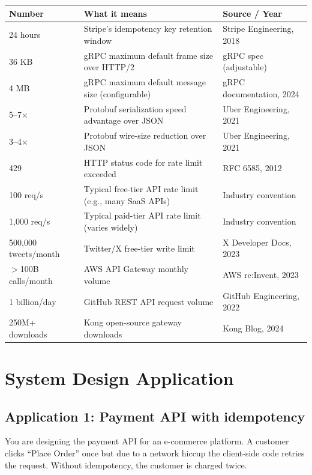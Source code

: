 \documentclass[11pt,a4paper]{article}
\begin{document}
\begin{center}
\renewcommand{\arraystretch}{1.4}
\begin{tabularx}{\textwidth}{lXl}
\toprule
\textbf{Number} & \textbf{What it means} & \textbf{Source / Year} \\
\midrule
24 hours & Stripe's idempotency key retention window & Stripe Engineering, 2018 \\
36 KB & gRPC maximum default frame size over HTTP/2 & gRPC spec (adjustable) \\
4 MB & gRPC maximum default message size (configurable) & gRPC documentation, 2024 \\
5--7$\times$ & Protobuf serialization speed advantage over JSON & Uber Engineering, 2021 \\
3--4$\times$ & Protobuf wire-size reduction over JSON & Uber Engineering, 2021 \\
429 & HTTP status code for rate limit exceeded & RFC 6585, 2012 \\
100 req/s & Typical free-tier API rate limit (e.g., many SaaS APIs) & Industry convention \\
1,000 req/s & Typical paid-tier API rate limit (varies widely) & Industry convention \\
500,000 tweets/month & Twitter/X free-tier write limit & X Developer Docs, 2023 \\
$>$100B calls/month & AWS API Gateway monthly volume & AWS re:Invent, 2023 \\
1 billion/day & GitHub REST API request volume & GitHub Engineering, 2022 \\
250M+ downloads & Kong open-source gateway downloads & Kong Blog, 2024 \\
\bottomrule
\end{tabularx}
\end{center}

\section{System Design Application}

\subsection{Application 1: Payment API with idempotency}

You are designing the payment API for an e-commerce platform. A customer clicks ``Place Order'' once but due to a network hiccup the client-side code retries the request. Without idempotency, the customer is charged twice.
\end{document}
